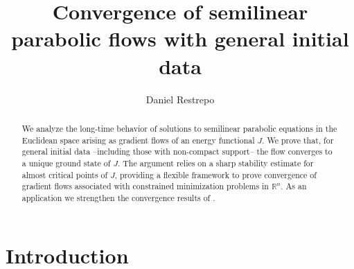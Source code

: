 \documentclass[11pt,letterpaper,reqno]{amsart}
\title{Convergence of semilinear parabolic flows with general initial data}
\author{Daniel Restrepo}
\theoremstyle{plain}%
\theoremstyle{definition}
\numberwithin{equation}{section}
\numberwithin{figure}{section}
\begin{document}
\begin{abstract} {\rm 
We analyze the long-time behavior of solutions to semilinear parabolic equations in the Euclidean space arising as gradient flows of an energy functional $J$. We prove that, for general initial data --including those with non-compact support-- the flow converges to a unique ground state of $J$. The argument relies on a sharp stability estimate for almost critical points of \(J\), providing a flexible framework to prove convergence of gradient flows associated with constrained minimization problems in \(\mathbb{R}^n\). As an application we strengthen the convergence results of \cite{cortazar1999uniqueness, feireisl1997threshold}. }
	\end{abstract}
	
	\maketitle

    \section{Introduction}
\end{document}

